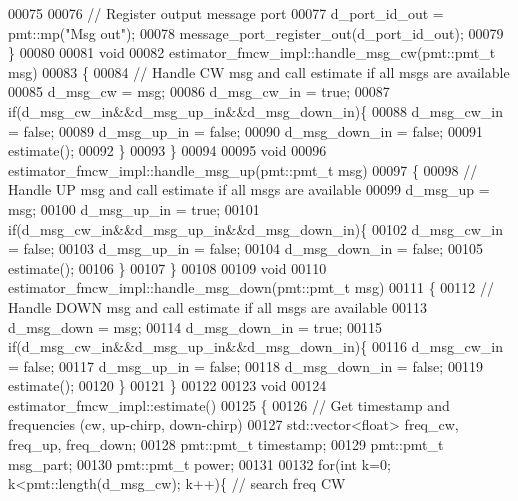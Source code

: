 \begin{DoxyCode}
00075         
00076         \textcolor{comment}{// Register output message port}
00077         d_port_id_out = pmt::mp(\textcolor{stringliteral}{"Msg out"});
00078         message\_port\_register\_out(d_port_id_out);
00079     \}
00080     
00081     \textcolor{keywordtype}{void}
00082     estimator_fmcw_impl::handle_msg_cw(pmt::pmt\_t msg)
00083     \{
00084         \textcolor{comment}{// Handle CW msg and call estimate if all msgs are available}
00085         d_msg_cw = msg;
00086         d_msg_cw_in = \textcolor{keyword}{true};
00087         \textcolor{keywordflow}{if}(d_msg_cw_in&&d_msg_up_in&&d_msg_down_in)\{
00088             d_msg_cw_in = \textcolor{keyword}{false};
00089             d_msg_up_in = \textcolor{keyword}{false};
00090             d_msg_down_in = \textcolor{keyword}{false};
00091             estimate();
00092         \}
00093     \}
00094     
00095     \textcolor{keywordtype}{void}
00096     estimator_fmcw_impl::handle_msg_up(pmt::pmt\_t msg)
00097     \{
00098         \textcolor{comment}{// Handle UP msg and call estimate if all msgs are available}
00099         d_msg_up = msg;
00100         d_msg_up_in = \textcolor{keyword}{true};
00101         \textcolor{keywordflow}{if}(d_msg_cw_in&&d_msg_up_in&&d_msg_down_in)\{
00102             d_msg_cw_in = \textcolor{keyword}{false};
00103             d_msg_up_in = \textcolor{keyword}{false};
00104             d_msg_down_in = \textcolor{keyword}{false};
00105             estimate();
00106         \}
00107     \}
00108     
00109     \textcolor{keywordtype}{void}
00110     estimator_fmcw_impl::handle_msg_down(pmt::pmt\_t msg)
00111     \{
00112         \textcolor{comment}{// Handle DOWN msg and call estimate if all msgs are available}
00113         d_msg_down = msg;
00114         d_msg_down_in = \textcolor{keyword}{true};
00115         \textcolor{keywordflow}{if}(d_msg_cw_in&&d_msg_up_in&&d_msg_down_in)\{
00116             d_msg_cw_in = \textcolor{keyword}{false};
00117             d_msg_up_in = \textcolor{keyword}{false};
00118             d_msg_down_in = \textcolor{keyword}{false};
00119             estimate();
00120         \}
00121     \}
00122     
00123     \textcolor{keywordtype}{void}
00124     estimator_fmcw_impl::estimate()
00125     \{
00126         \textcolor{comment}{// Get timestamp and frequencies (cw, up-chirp, down-chirp)}
00127         std::vector<float> freq_cw, freq_up, freq_down;
00128         pmt::pmt\_t timestamp;
00129         pmt::pmt\_t msg\_part;
00130         pmt::pmt\_t power;
00131         
00132         \textcolor{keywordflow}{for}(\textcolor{keywordtype}{int} k=0; k<pmt::length(d_msg_cw); k++)\{ \textcolor{comment}{// search freq CW}

\end{DoxyCode}

